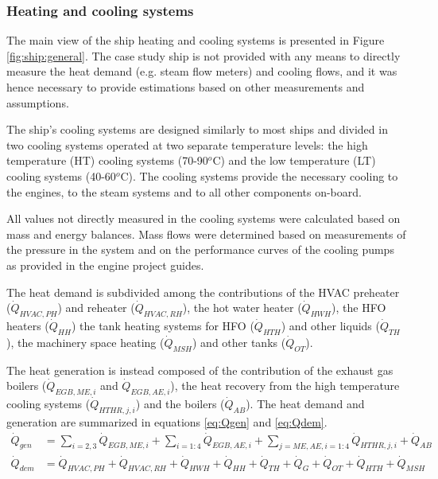 \documentclass[preprint,12pt]{elsarticle}
\begin{document}
\subsubsection{Heating and cooling systems} \label{sec:met:heat}

The main view of the ship heating and cooling systems is presented in Figure \ref{fig:ship:general}. The case study ship is not provided with any means to directly measure the heat demand (e.g. steam flow meters) and cooling flows, and it was hence necessary to provide estimations based on other measurements and assumptions.  

The ship's cooling systems are designed similarly to most ships and divided in two cooling systems operated at two separate temperature levels: the high temperature (HT) cooling systems (70-90$^o$C) and the low temperature (LT) cooling systems (40-60$^o$C). The cooling systems provide the necessary cooling to the engines, to the steam systems and to all other components on-board. 


All values not directly measured in the cooling systems were calculated based on mass and energy balances. Mass flows were determined based on measurements of the pressure in the system and on the performance curves of the cooling pumps as provided in the engine project guides.

The heat demand is subdivided among the contributions of the HVAC preheater ($\dot{Q}_{HVAC,PH}$) and reheater ($\dot{Q}_{HVAC,RH}$), the hot water heater ($\dot{Q}_{HWH}$), the HFO heaters ($\dot{Q}_{HH}$) the tank heating systems for HFO ($\dot{Q}_{HTH}$) and other liquids ($\dot{Q}_{TH}$), the machinery space heating ($\dot{Q}_{MSH}$) and other tanks ($\dot{Q}_{OT}$). 

The heat generation is instead composed of the contribution of the exhaust gas boilers ($\dot{Q}_{EGB,ME,i}$ and $\dot{Q}_{EGB,AE,i}$), the heat recovery from the high temperature cooling systems ($\dot{Q}_{HTHR,j,i}$) and the boilers ($\dot{Q}_{AB}$).
 The heat demand and generation are summarized in equations \ref{eq:Qgen} and \ref{eq:Qdem}.
\begin{align}
\dot{Q}_{gen} & = \sum_{i=2,3} \dot{Q}_{EGB,ME,i} +  \sum_{i=1:4} \dot{Q}_{EGB,AE,i} + \sum_{j=ME,AE, i=1:4}\dot{Q}_{HTHR,j,i} + \dot{Q}_{AB} \label{eq:Qgen} \\
\dot{Q}_{dem} & = \dot{Q}_{HVAC,PH} + \dot{Q}_{HVAC,RH} + \dot{Q}_{HWH} + \dot{Q}_{HH} + \dot{Q}_{TH} + \dot{Q}_{G} + \dot{Q}_{OT} + 	\dot{Q}_{HTH} + \dot{Q}_{MSH} \label{eq:Qdem}
\end{align}
\end{document}
